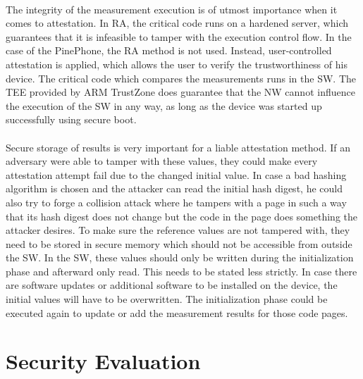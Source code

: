\paragraph*{}
The integrity of the measurement execution is of utmost importance when it comes to attestation. In RA, the critical code runs on a hardened server, which guarantees that it is infeasible to tamper with the execution control flow. In the case of the PinePhone, the RA method is not used. Instead, user-controlled attestation is applied, which allows the user to verify the trustworthiness of his device. The critical code which compares the measurements runs in the SW. The TEE provided by ARM TrustZone does guarantee that the NW cannot influence the execution of the SW in any way, as long as the device was started up successfully using secure boot.

\paragraph*{}
Secure storage of results is very important for a liable attestation method. If an adversary were able to tamper with these values, they could make every attestation attempt fail due to the changed initial value. In case a bad hashing algorithm is chosen and the attacker can read the initial hash digest, he could also try to forge a collision attack \cite{SafaryanOlga2021MHCC} where he tampers with a page in such a way that its hash digest does not change but the code in the page does something the attacker desires. To make sure the reference values are not tampered with, they need to be stored in secure memory which should not be accessible from outside the SW. In the SW, these values should only be written during the initialization phase and afterward only read. This needs to be stated less strictly. In case there are software updates or additional software to be installed on the device, the initial values will have to be overwritten. The initialization phase could be executed again to update or add the measurement results for those code pages. 

\section{Security Evaluation}

